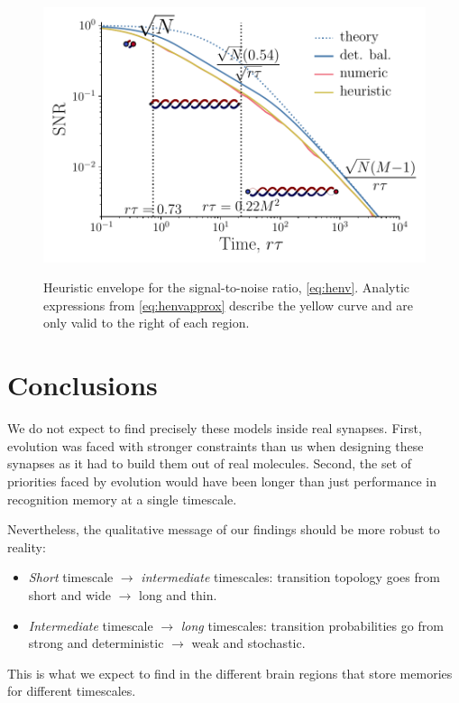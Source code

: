 \documentclass[12pt]{article}
\begin{document}
\begin{figure}[tb]
  \centering
  \includegraphics[width=0.8\linewidth]{LenvHeuristic.pdf}\\
  \caption[Heuristic envelope for the signal-to-noise ratio]
  {Heuristic envelope  for the signal-to-noise ratio, \cref{eq:henv}.
  Analytic expressions from \cref{eq:henvapprox} describe the yellow curve and are only valid to the right of each region.}\label{fig:heuristicenv}
\end{figure}


\section{Conclusions}\label{sec:conclusions}


We do not expect to find precisely these models inside real synapses.
First, evolution was faced with stronger constraints than us when designing these synapses as it had to build them out of real molecules.
Second, the set of priorities faced by evolution would have been longer than just performance in recognition memory at a single timescale.

Nevertheless, the qualitative message of our findings should be more robust to reality:
%
\begin{itemize}
  \item \emph{Short} timescale \(\to\) \emph{intermediate} timescales: transition topology goes from \\ short and wide \(\to\) long and thin.
  \item \emph{Intermediate} timescale \(\to\) \emph{long} timescales: transition probabilities go from \\ strong and deterministic \(\to\) weak and stochastic.
\end{itemize}
%
This is what we expect to find in the different brain regions that store memories for different timescales.
\end{document}
